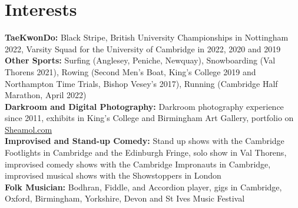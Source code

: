 \documentclass{article}
\begin{document}
\section*{Interests}
\textbf{TaeKwonDo:} Black Stripe, British University Championships in Nottingham 2022, Varsity Squad for the University of Cambridge in 2022, 2020 and 2019\\
\textbf{Other Sports:} Surfing (Anglesey, Peniche, Newquay),
Snowboarding (Val Thorens 2021), 
Rowing (Second Men's Boat, King's College 2019 and Northampton Time Trials, Bishop Vesey's 2017), Running (Cambridge Half Marathon, April 2022)\\
\textbf{Darkroom and Digital Photography:} Darkroom photography experience since 2011,  exhibits in King's College and Birmingham Art Gallery, portfolio on \href{www.sheamol.com}{Sheamol.com}\\
\textbf{Improvised and Stand-up Comedy:} Stand up shows with the Cambridge Footlights in Cambridge and the Edinburgh Fringe, solo show in Val Thorens, improvised comedy shows with the Cambridge Impronauts in Cambridge, improvised musical shows with the Showstoppers in London \\
\textbf{Folk Musician:} Bodhran, Fiddle, and Accordion %
player, gigs in Cambridge, Oxford, Birmingham, Yorkshire, Devon and St Ives Music Festival \\ %

\vspace{-.75\baselineskip}
\hrulefill
\vspace{-.75\baselineskip}
\end{document}
